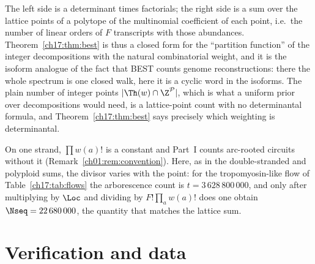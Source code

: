 The left side is a determinant times factorials; the right side is a sum over the lattice
points of a polytope of the multinomial coefficient of each point, i.e.\ the number of
linear orders of $F$ transcripts with those abundances. Theorem~\ref{ch17:thm:best} is thus a
closed form for the ``partition function'' of the integer decompositions with the natural
combinatorial weight, and it is the isoform analogue of the fact that BEST counts genome
reconstructions: there the whole spectrum is one closed walk, here it is a cyclic word in
the isoforms. The plain number of integer points $|\Th(w)\cap\Z^{\mathcal P}|$, which is
what a uniform prior over decompositions would need, is a lattice-point count with no
determinantal formula, and Theorem~\ref{ch17:thm:best} says precisely which weighting is
determinantal.

\begin{remark}
On one strand, $\prod w(a)!$ is a constant and Part~I counts arc-rooted
circuits without it (Remark~\ref{ch01:rem:convention}). Here, as in the double-stranded and polyploid sums, the divisor varies
with the point: for the tropomyosin-like flow of Table~\ref{ch17:tab:flows} the arborescence count
is $t=3\,628\,800\,000$, and only after multiplying by $\Loc$ and dividing by
$F!\prod_aw(a)!$ does one obtain $\Nseq=22\,680\,000$, the quantity that matches the lattice
sum.
\end{remark}

\section{Verification and data}\label{ch17:sec:data}

